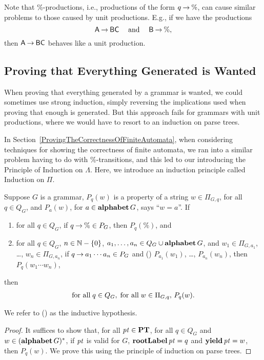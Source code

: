 Note that $\%$-productions, i.e., productions of the form $q\mathbin{\to}\%$,
can cause similar problems to those caused by unit productions.  E.g.,
if we have the productions
\begin{displaymath}
  \mathsf{A}\mathbin{\to} \mathsf{B}\mathsf{C} \quad\;\allowbreak\mbox{and}\allowbreak\;\quad \mathsf{B}\mathbin{\to}\% ,
\end{displaymath}
then $\mathsf{A}\mathbin{\to}\mathsf{B}\mathsf{C}$ behaves like a unit production.

\subsection{Proving that Everything Generated is Wanted}

When proving that everything generated by a grammar is wanted, we
could sometimes use strong induction, simply reversing the
implications used when proving that enough is generated.  But this
approach fails for grammars with unit productions, where we would have
to resort to an induction on parse trees.  

In Section~\ref{ProvingTheCorrectnessOfFiniteAutomata}, when
considering techniques for showing the correctness of finite automata,
we ran into a similar problem having to do with $\%$-transitions, and
this led to our introducing the Principle of Induction on $\Lambda$.
Here, we introduce an induction principle called Induction on $\Pi$.

\begin{theorem}
Suppose $G$ is a grammar, $P_q(w)$ is a property of a
string $w\in\Pi_{G,q}$, for all $q\in Q_G$, and
$P_a(w)$, for $a\in\mathbf{alphabet}\,G$, says ``$w=a$''.
If
\begin{enumerate}[\quad(1)]
\item for all $q\in Q_G$, if $q\mathbin{\to}\%\in P_G$, then $P_q(\%)$, and

\item for all $q\in Q_G$, $n\in\mathbb{N}-\{0\}$, $a_1,\ldots,a_n\in
  Q_G\cup\mathbf{alphabet}\,G$, and $w_1\in\Pi_{G,a_1}$, \ldots,
  $w_n\in\Pi_{G,a_n}$, if $q\mathbin{\to} a_1\cdots a_n\in P_G$ and (\dag)
  $P_{a_1}(w_1)$, \ldots, $P_{a_n}(w_n)$, then $P_q(w_1\cdots w_n)$,
\end{enumerate}
then
\begin{gather*}
  \allowbreak\mbox{for all}\allowbreak\;q\in Q_G, \;\allowbreak\mbox{for all}\allowbreak\;w\in\Pi_{G,q},\,P_q(w).
\end{gather*}
\end{theorem}
We refer to (\dag) as the inductive hypothesis.

\begin{proof}
It suffices to show that, for all ${\it pt}\in\mathbf{PT}$, for all 
$q\in Q_G$ and $w\in(\mathbf{alphabet}\,G)^*$, if
${\it pt}$ is valid for $G$, $\mathbf{rootLabel}\,{\it pt} = q$ and
$\mathbf{yield}\,{\it pt} = w$, then $P_q(w)$.
We prove this using the principle of induction on parse trees.
\end{proof}

